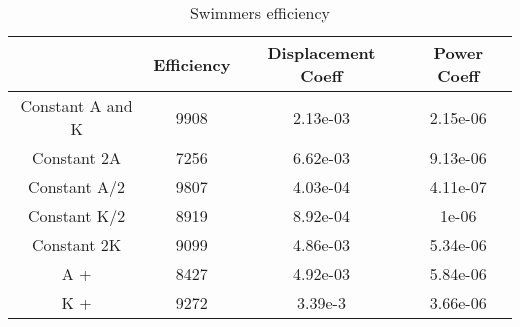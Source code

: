 \begin{table}[h]
\begin{tabular}{|c|c|c|c|}
\hline
                 & Efficiency & Displacement Coeff & Power Coeff \\ \hline
Constant A and K & 9908       & 2.13e-03           & 2.15e-06    \\ \hline
Constant 2A      & 7256       & 6.62e-03           & 9.13e-06    \\ \hline
Constant A/2     & 9807       & 4.03e-04           & 4.11e-07    \\ \hline
Constant K/2     & 8919       & 8.92e-04           & 1e-06       \\ \hline
Constant 2K      & 9099       & 4.86e-03           & 5.34e-06    \\ \hline
A +              & 8427       & 4.92e-03           & 5.84e-06    \\ \hline
K +              & 9272       & 3.39e-3            & 3.66e-06    \\ \hline
\end{tabular}
\caption{Swimmers efficiency}
\end{table}